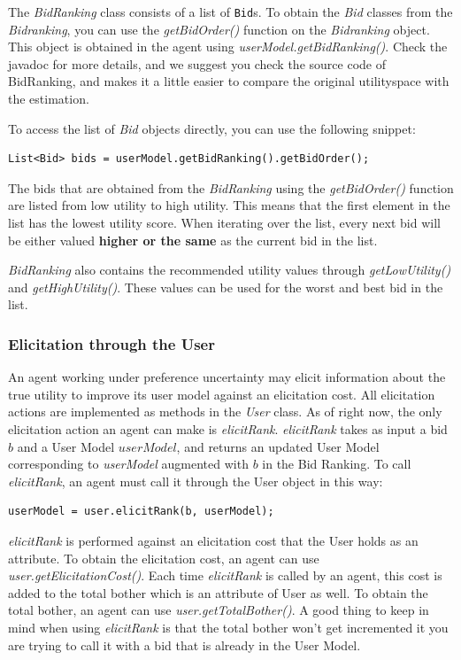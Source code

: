 \documentclass[]{article}
\begin{document}
The \textit{BidRanking} class consists of a list of \verb|Bid|s. To obtain the \textit{Bid} classes from the \textit{Bidranking}, you can use the \textit{getBidOrder()} function on the \textit{Bidranking} object. This object is obtained in the agent using \textit{userModel.getBidRanking()}. Check the javadoc for more details, and we suggest you check the source code of BidRanking, and makes it a little easier to compare the original utilityspace with the estimation.

To access the list of \textit{Bid} objects directly, you can use the following snippet:
\begin{lstlisting}
List<Bid> bids = userModel.getBidRanking().getBidOrder();
\end{lstlisting}

The bids that are obtained from the \textit{BidRanking} using the \textit{getBidOrder()} function are listed from low utility to high utility. This means that the first element in the list has the lowest utility score. When iterating over the list, every next bid will be either valued \textbf{higher or the same} as the current bid in the list.

\textit{BidRanking} also contains the recommended utility values through \textit{getLowUtility()} and \textit{getHighUtility()}. These values can be used for the worst and best bid in the list.


\subsubsection{Elicitation through the User}
An agent working under preference uncertainty may elicit information about the true utility to improve its user model against an elicitation cost. All elicitation actions are implemented as methods in the \textit{User} class. As of right now, the only elicitation action an agent can make is \textit{elicitRank}. \textit{elicitRank} takes as input a bid $b$ and a User Model $userModel$, and returns an updated User Model corresponding to \textit{userModel} augmented with $b$ in the Bid Ranking. To call \textit{elicitRank}, an agent must call it through the User object in this way:
\begin{lstlisting}
userModel = user.elicitRank(b, userModel);
\end{lstlisting}

\textit{elicitRank} is performed against an elicitation cost that the User holds as an attribute. To obtain the elicitation cost, an agent can use \textit{user.getElicitationCost()}. Each time \textit{elicitRank} is called by an agent, this cost is added to the total bother which is an attribute of User as well. To obtain the total bother, an agent can use \textit{user.getTotalBother()}. 
A good thing to keep in mind when using \textit{elicitRank} is that the total bother won't get incremented it you are trying to call it with a bid that is already in the User Model. 
\end{document}
